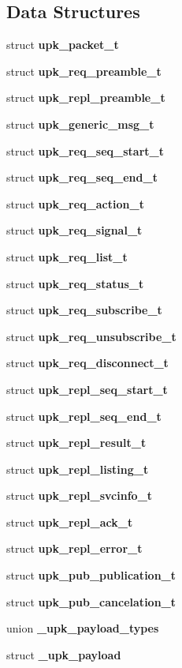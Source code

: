 \subsection*{Data Structures}
\begin{DoxyCompactItemize}
\item 
struct {\bf upk\_\-packet\_\-t}
\item 
struct {\bf upk\_\-req\_\-preamble\_\-t}
\item 
struct {\bf upk\_\-repl\_\-preamble\_\-t}
\item 
struct {\bf upk\_\-generic\_\-msg\_\-t}
\item 
struct {\bf upk\_\-req\_\-seq\_\-start\_\-t}
\item 
struct {\bf upk\_\-req\_\-seq\_\-end\_\-t}
\item 
struct {\bf upk\_\-req\_\-action\_\-t}
\item 
struct {\bf upk\_\-req\_\-signal\_\-t}
\item 
struct {\bf upk\_\-req\_\-list\_\-t}
\item 
struct {\bf upk\_\-req\_\-status\_\-t}
\item 
struct {\bf upk\_\-req\_\-subscribe\_\-t}
\item 
struct {\bf upk\_\-req\_\-unsubscribe\_\-t}
\item 
struct {\bf upk\_\-req\_\-disconnect\_\-t}
\item 
struct {\bf upk\_\-repl\_\-seq\_\-start\_\-t}
\item 
struct {\bf upk\_\-repl\_\-seq\_\-end\_\-t}
\item 
struct {\bf upk\_\-repl\_\-result\_\-t}
\item 
struct {\bf upk\_\-repl\_\-listing\_\-t}
\item 
struct {\bf upk\_\-repl\_\-svcinfo\_\-t}
\item 
struct {\bf upk\_\-repl\_\-ack\_\-t}
\item 
struct {\bf upk\_\-repl\_\-error\_\-t}
\item 
struct {\bf upk\_\-pub\_\-publication\_\-t}
\item 
struct {\bf upk\_\-pub\_\-cancelation\_\-t}
\item 
union {\bf \_\-upk\_\-payload\_\-types}
\item 
struct {\bf \_\-upk\_\-payload}
\end{DoxyCompactItemize}
